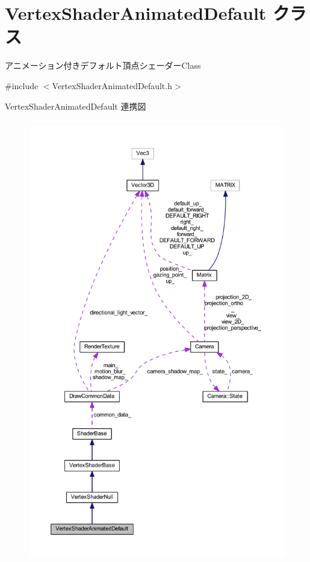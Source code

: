 \hypertarget{class_vertex_shader_animated_default}{}\section{Vertex\+Shader\+Animated\+Default クラス}
\label{class_vertex_shader_animated_default}


アニメーション付きデフォルト頂点シェーダー\+Class  




{\ttfamily \#include $<$Vertex\+Shader\+Animated\+Default.\+h$>$}



Vertex\+Shader\+Animated\+Default 連携図\nopagebreak
\begin{figure}[H]
\begin{center}
\leavevmode
\includegraphics[height=550pt]{class_vertex_shader_animated_default__coll__graph}
\end{center}
\end{figure}
